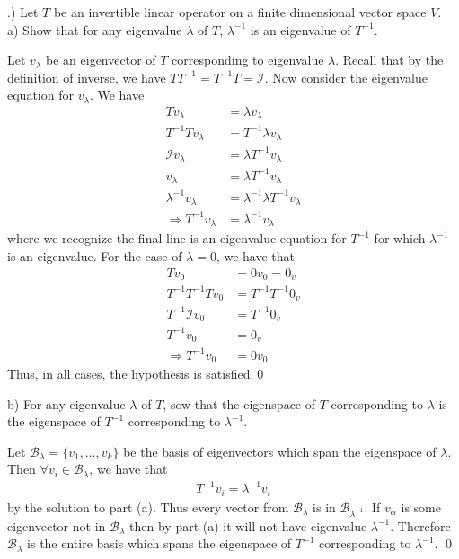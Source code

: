 \documentclass[a4paper, 11pt]{article}
\newenvironment{solution}{%
	\begin{list}{}{%
			\setlength{\topsep}{0pt}%
			\setlength{\leftmargin}{1.5cm}%
			\setlength{\rightmargin}{1.5cm}%
			\setlength{\listparindent}{\parindent}%
			\setlength{\itemindent}{\parindent}%
			\setlength{\parsep}{\parskip}%
		}%
		\item[]}{\end{list}}
\begin{document}
.) Let $T$ be an invertible linear operator on a finite dimensional vector space $V$. \\
\noindent a) Show that for any eigenvalue $\lambda$ of $T$, $\lambda^{-1}$ is an eigenvalue of $T^{-1}$.\\
\begin{solution}
  \noindent Let $v_\lambda$ be an eigenvector of $T$ corresponding to eigenvalue $\lambda$. Recall that by the definition of inverse, we have $TT^{-1}=T^{-1}T=\mathcal{I}$. Now consider the eigenvalue equation for $v_\lambda$. We have
  \begin{align*}
    Tv_\lambda &= \lambda v_\lambda \\
    T^{-1}T v_\lambda &= T^{-1}\lambda v_\lambda \\
    \mathcal{I}v_\lambda &= \lambda T^{-1} v_\lambda \\
    v_\lambda &= \lambda T^{-1}v_\lambda \\
    \lambda^{-1}v_\lambda &= \lambda^{-1}\lambda T^{-1}v_\lambda \\
    \Rightarrow T^{-1}v_\lambda &= \lambda^{-1}v_\lambda 
  \end{align*}
  where we recognize the final line is an eigenvalue equation for $T^{-1}$ for which $\lambda^{-1}$ is an eigenvalue. For the case of $\lambda = 0$, we have that
  \begin{align*}
    Tv_0 &= 0v_0 = 0_v \\
    T^{-1}T^{-1}T v_0 &= T^{-1}T^{-1}0_v \\
    T^{-1}\mathcal{I}v_0 &= T^{-1}0_v \\
    T^{-1}v_0 &= 0_v \\
    \Rightarrow T^{-1}v_0 &= 0v_0
  \end{align*}
  Thus, in all cases, the hypothesis is satisfied.\qed \\
\end{solution}

\noindent b) For any eigenvalue $\lambda$ of $T$, sow that the eigenspace of $T$ corresponding to $\lambda$ is the eigenspace of $T^{-1}$ corresponding to $\lambda^{-1}$.\\
\begin{solution}
  \noindent Let $\mathcal{B}_\lambda = \{v_1, \dots , v_k\}$ be the basis of eigenvectors which span the eigenspace of $\lambda$. Then $\forall v_i \in \mathcal{B}_\lambda$, we have that
  \begin{align*}
    T^{-1}v_i = \lambda^{-1}v_i
  \end{align*}
  by the solution to part (a). Thus every vector from $\mathcal{B}_{\lambda}$ is in $\mathcal{B}_{\lambda^{-1}}$. If $v_\alpha$ is some eigenvector not in $\mathcal{B}_\lambda$ then by part (a) it will not have eigenvalue $\lambda^{-1}$. Therefore $\mathcal{B}_\lambda$ is the entire basis which spans the eigenspace of $T^{-1}$ corresponding to $\lambda^{-1}$. \qed \\  
\end{solution}
\end{document}
